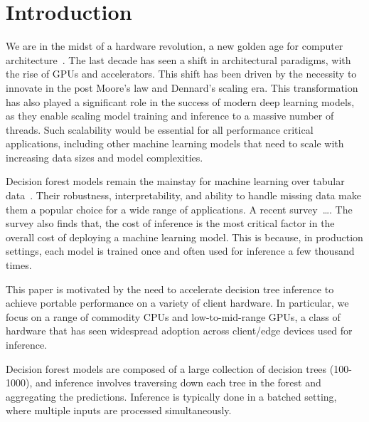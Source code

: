 \section{Introduction}
\label{sec:intro}
We are in the midst of a hardware revolution, a new golden age for computer architecture~\cite{GoldenAge}. The last 
decade has seen a shift in architectural paradigms, with the rise of GPUs and accelerators. This shift has been driven
by the necessity to innovate in the post Moore's law and Dennard's scaling era. This transformation has also played 
a significant role in the success of modern deep learning models, as they enable scaling model training and inference 
to a massive number of threads. Such scalability would be essential for all performance critical applications, including
other machine learning models that need to scale with increasing data sizes and model complexities. 

Decision forest models remain the mainstay for machine learning over tabular data~\cite{DLNotAllYouNeed,TreebasedOutperformDL}. 
Their robustness, interpretability, and ability to handle missing data make them a popular choice for a wide range of applications. 
A recent survey~\cite{kaggle}\dots. 
The survey also finds that, the cost of inference is the most critical factor in the overall cost of deploying a machine learning model.
This is because, in production settings, each model is trained once and often used for inference a few thousand times. 
%

This paper is motivated by the need to accelerate decision tree inference to achieve portable performance on a variety of client hardware.
In particular, we focus on a range of commodity CPUs and low-to-mid-range GPUs, a class of hardware that has seen widespread adoption across client/edge devices used for inference.

Decision forest models are composed of a large collection of decision trees (100-1000), and inference involves traversing down each tree in the forest and aggregating the predictions. Inference is typically done in a batched setting, where multiple inputs are processed simultaneously.

